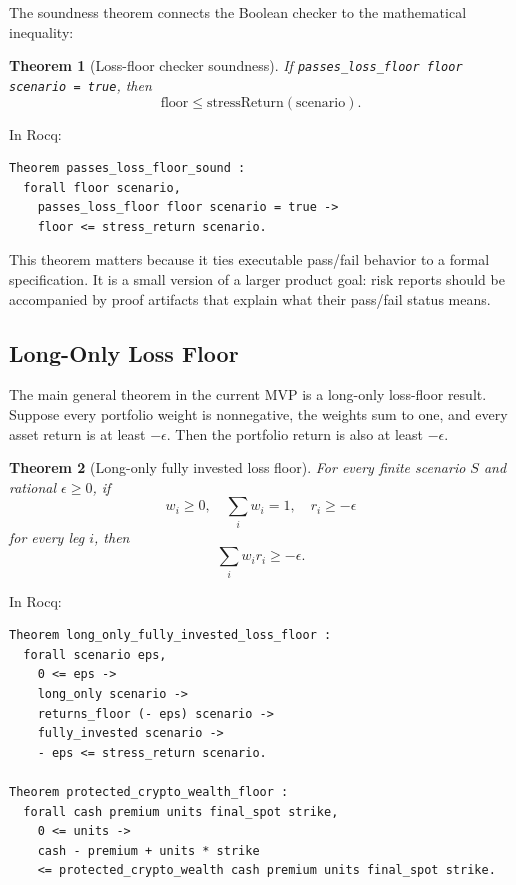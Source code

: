 \documentclass[11pt]{article}
\newtheorem{theorem}{Theorem}
\begin{document}
The soundness theorem connects the Boolean checker to the mathematical
inequality:

\begin{theorem}[Loss-floor checker soundness]
If \texttt{passes\_loss\_floor floor scenario = true}, then
\[
  \mathrm{floor} \leq \mathrm{stressReturn}(\mathrm{scenario}).
\]
\end{theorem}

In Rocq:

\begin{lstlisting}[language=Coq]
Theorem passes_loss_floor_sound :
  forall floor scenario,
    passes_loss_floor floor scenario = true ->
    floor <= stress_return scenario.
\end{lstlisting}

This theorem matters because it ties executable pass/fail behavior to a formal
specification. It is a small version of a larger product goal: risk reports
should be accompanied by proof artifacts that explain what their pass/fail
status means.

\subsection{Long-Only Loss Floor}

The main general theorem in the current MVP is a long-only loss-floor result.
Suppose every portfolio weight is nonnegative, the weights sum to one, and
every asset return is at least \(-\epsilon\). Then the portfolio return is also
at least \(-\epsilon\).

\begin{theorem}[Long-only fully invested loss floor]
For every finite scenario \(S\) and rational \(\epsilon \geq 0\), if
\[
  w_i \geq 0,\quad \sum_i w_i = 1,\quad r_i \geq -\epsilon
\]
for every leg \(i\), then
\[
  \sum_i w_i r_i \geq -\epsilon.
\]
\end{theorem}

In Rocq:

\begin{lstlisting}[language=Coq]
Theorem long_only_fully_invested_loss_floor :
  forall scenario eps,
    0 <= eps ->
    long_only scenario ->
    returns_floor (- eps) scenario ->
    fully_invested scenario ->
    - eps <= stress_return scenario.

Theorem protected_crypto_wealth_floor :
  forall cash premium units final_spot strike,
    0 <= units ->
    cash - premium + units * strike
    <= protected_crypto_wealth cash premium units final_spot strike.
\end{lstlisting}
\end{document}
